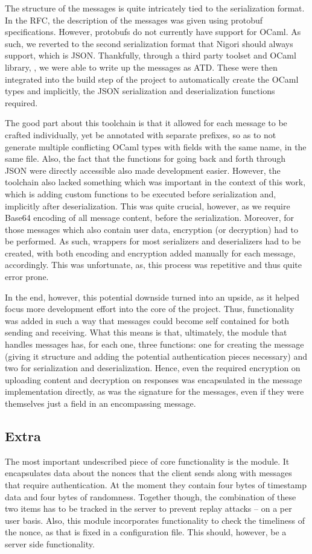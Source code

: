 The structure of the messages is quite intricately tied to the serialization format.
In the RFC, the description of the messages was given using protobuf specifications.
However, protobufs do not currently have support for OCaml.
As such, we reverted to the second serialization format that Nigori should always support, which is JSON.
Thankfully, through a third party toolset and OCaml library, , we were able to write up the messages as ATD.
These were then integrated into the build step of the project to automatically create the OCaml types and implicitly, the JSON serialization and deserialization functions required.

The good part about this toolchain is that it allowed for each message to be crafted individually, yet be annotated with separate prefixes, so as to not generate multiple conflicting OCaml types with fields with the same name, in the same file.
Also, the fact that the functions for going back and forth through JSON were directly accessible also made development easier.
However, the toolchain also lacked something which was important in the context of this work, which is adding custom functions to be executed before serialization and, implicitly after deserialization.
This was quite crucial, however, as we require Base64 encoding of all message content, before the serialization.
Moreover, for those messages which also contain user data, encryption (or decryption) had to be performed.
As such, wrappers for most serializers and deserializers had to be created, with both encoding and encryption added manually for each message, accordingly.
This was unfortunate, as, this process was repetitive and thus quite error prone.

In the end, however, this potential downside turned into an upside, as it helped focus more development effort into the core of the project.
Thus, functionality was added in such a way that messages could become self contained for both sending and receiving.
What this means is that, ultimately, the module that handles messages has, for each one, three functions: one for creating the message (giving it structure and adding the potential authentication pieces necessary) and two for serialization and deserialization.
Hence, even the required encryption on uploading content and decryption on responses was encapsulated in the message implementation directly, as was the  signature for the messages, even if they were themselves just a field in an encompassing message.

\subsection{Extra}
The most important undescribed piece of core functionality is the  module.
It encapsulates data about the nonces that the client sends along with messages that require authentication.
At the moment they contain four bytes of timestamp data and four bytes of randomness.
Together though, the combination of these two items has to be tracked in the server to prevent replay attacks -- on a per user basis.
Also, this module incorporates functionality to check the timeliness of the nonce, as that is fixed in a configuration file.
This should, however, be a server side functionality.

